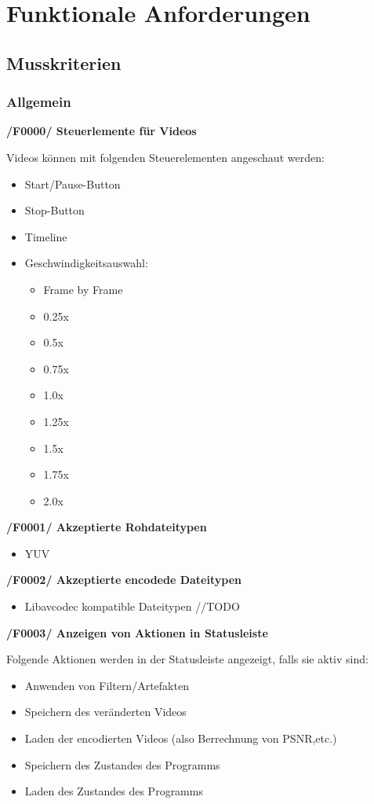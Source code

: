 \documentclass[parskip=full]{scrartcl}
\begin{document}
\section{Funktionale Anforderungen}
\subsection{Musskriterien}
\subsubsection{Allgemein}
\textbf{/F0000/ Steuerlemente für Videos}

Videos können mit folgenden Steuerelementen angeschaut werden:
\begin{itemize}
\item Start/Pause-Button
\item Stop-Button
\item Timeline
\item Geschwindigkeitsauswahl:
\begin{itemize}
\item Frame by Frame
\item 0.25x
\item 0.5x
\item 0.75x
\item 1.0x
\item 1.25x
\item 1.5x
\item 1.75x
\item 2.0x
\end{itemize}
\end{itemize}

\textbf{/F0001/ Akzeptierte Rohdateitypen}

\begin{itemize}
\item YUV
\end{itemize}
\newpage
\textbf{/F0002/ Akzeptierte encodede Dateitypen}
\begin{itemize}
\item Libavcodec kompatible Dateitypen //TODO
\end{itemize}

\textbf{/F0003/ Anzeigen von Aktionen in Statusleiste}

Folgende Aktionen werden in der Statusleiste angezeigt, falls sie aktiv sind:
\begin{itemize}
\item Anwenden von Filtern/Artefakten
\item Speichern des veränderten Videos
\item Laden der encodierten Videos (also Berrechnung von PSNR,etc.)
\item Speichern des Zustandes des Programms
\item Laden des Zustandes des Programms
\end{itemize}
\end{document}
